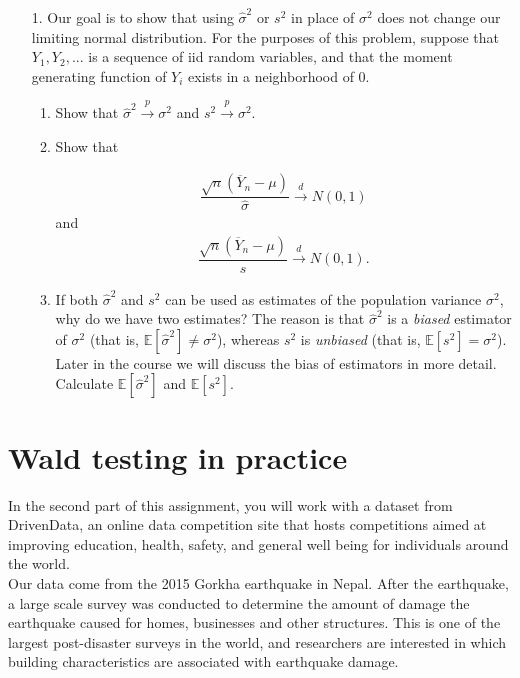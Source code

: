 \documentclass[11pt]{article}
\begin{document}
\begin{enumerate}
\item[1.] Our goal is to show that using $\widehat{\sigma}^2$ or $s^2$ in place of $\sigma^2$ does not change our limiting normal distribution. For the purposes of this problem, suppose that $Y_1, Y_2,...$ is a sequence of iid random variables, and that the moment generating function of $Y_i$ exists in a neighborhood of 0.

\begin{enumerate}
\item Show that $\widehat{\sigma}^2 \overset{p}{\to} \sigma^2$ and $s^2 \overset{p}{\to} \sigma^2$.

\item Show that

\begin{align*}
\dfrac{\sqrt{n}(\overline{Y}_n - \mu)}{\widehat{\sigma}} \overset{d}{\to} N(0, 1)
\end{align*}
and
\begin{align*}
\dfrac{\sqrt{n}(\overline{Y}_n - \mu)}{s} \overset{d}{\to} N(0, 1).
\end{align*}

\item If both $\widehat{\sigma}^2$ and $s^2$ can be used as estimates of the population variance $\sigma^2$, why do we have two estimates? The reason is that $\widehat{\sigma}^2$ is a \textit{biased} estimator of $\sigma^2$ (that is, $\mathbb{E}[\widehat{\sigma}^2] \neq \sigma^2$), whereas $s^2$ is \textit{unbiased} (that is, $\mathbb{E}[s^2] = \sigma^2$). Later in the course we will discuss the bias of estimators in more detail.\\

Calculate $\mathbb{E}[\widehat{\sigma}^2]$ and $\mathbb{E}[s^2]$.
\end{enumerate}
\end{enumerate}

\section*{Wald testing in practice}

In the second part of this assignment, you will work with a dataset from DrivenData, an online data competition site that hosts competitions aimed at improving education, health, safety, and general well being for individuals around the world.\\

\noindent Our data come from the 2015 Gorkha earthquake in Nepal. After the earthquake, a large scale survey was conducted to determine the amount of damage the earthquake caused for homes, businesses and other structures. This is one of the largest post-disaster surveys in the world, and researchers are interested in which building characteristics are associated with earthquake damage.\\
\end{document}
